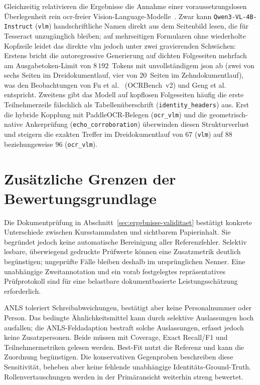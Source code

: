 Gleichzeitig relativieren die Ergebnisse die Annahme einer voraussetzungslosen Überlegenheit rein \ac{ocr}-freier Vision-Language-Modelle~\cite{Kim2022Donut,Wang2024Qwen2VL}. Zwar kann \texttt{Qwen3-VL-4B-Instruct} (\texttt{vlm}) handschriftliche Namen direkt aus dem Seitenbild lesen, die für Tesseract unzugänglich bleiben; auf mehrseitigen Formularen ohne wiederholte Kopfzeile leidet das direkte \ac{vlm} jedoch unter zwei gravierenden Schwächen: Erstens bricht die autoregressive Generierung auf dichten Folgeseiten mehrfach am Ausgabetoken-Limit von $8\,192$~Tokens mit unvollständigem \ac{json} ab (zwei von sechs Seiten im Dreidokumentlauf, vier von $20$~Seiten im Zehndokumentlauf), was den Beobachtungen von Fu et al.~\cite{Fu2025OCRBenchV2} (OCRBench~v2) und Geng et al.~\cite{Geng2023Grammar} entspricht. Zweitens gibt das Modell auf kopflosen Folgeseiten häufig die erste Teilnehmerzeile fälschlich als Tabellenüberschrift (\texttt{identity\_headers}) aus. Erst die hybride Kopplung mit PaddleOCR-Belegen (\texttt{ocr\_vlm}) und die geometrisch-native Ankerprüfung (\texttt{echo\_corroboration}) überwinden diesen Strukturverlust und steigern die exakten Treffer im Dreidokumentlauf von $67$ (\texttt{vlm}) auf $88$ beziehungsweise $96$ (\texttt{ocr\_vlm}).

\section{Zusätzliche Grenzen der Bewertungsgrundlage}
\label{sec:diskussion-validitaet}

Die Dokumentprüfung in Abschnitt~\ref{sec:ergebnisse-validitaet} bestätigt konkrete Unterschiede zwischen Kursstammdaten und sichtbarem Papierinhalt. Sie begründet jedoch keine automatische Bereinigung aller Referenzfehler. Selektiv lesbare, überwiegend gedruckte Prüfwerte können eine Zusatzmetrik deutlich begünstigen; ungeprüfte Fälle bleiben deshalb im ursprünglichen Nenner. Eine unabhängige Zweitannotation und ein vorab festgelegtes repräsentatives Prüfprotokoll sind für eine belastbare dokumentbasierte Leistungsschätzung erforderlich.

ANLS toleriert Schreibabweichungen, bestätigt aber keine Personalnummer oder Person. Das bedingte Ähnlichkeitsmittel kann durch selektive Auslassungen hoch ausfallen; die ANLS-Feldadaption bestraft solche Auslassungen, erfasst jedoch keine Zusatzpersonen. Beide müssen mit Coverage, Exact Recall/F1 und Teilnehmermetriken gelesen werden. Best-Fit nutzt die Referenz und kann die Zuordnung begünstigen. Die konservativen Gegenproben beschreiben diese Sensitivität, beheben aber keine fehlende unabhängige Identitäts-Ground-Truth. Rollenvertauschungen werden in der Primäransicht weiterhin streng bewertet.

